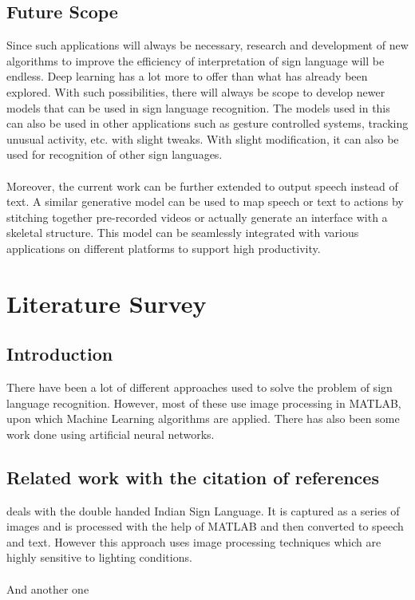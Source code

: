\documentclass[12pt,oneside,a4paper]{article}
\newcommand\todo[1]{\textcolor{blue}{#1}}
\newcommand\placeholder[1]{\todo{\lipsum[#1]}}
\begin{document}
		\subsection{Future Scope}
			Since such applications will always be necessary, research and development of new algorithms to improve the efficiency of interpretation of sign language will be endless. Deep learning has a lot more to offer than what has already been explored. With such possibilities, there will always be scope to develop newer models that can be used in sign language recognition. The models used in this can also be used in other applications such as gesture controlled systems, tracking unusual activity, etc. with slight tweaks. With slight modification, it can also be used for recognition of other sign languages. \\
			\\
			Moreover, the current work can be further extended to output speech instead of text. A similar generative model can be used to map speech or text to actions by stitching together pre-recorded videos or actually generate an interface with a skeletal structure. This model can be seamlessly integrated with various applications on different platforms to support high productivity.


	\section{Literature Survey}

		\subsection{Introduction}
			There have been a lot of different approaches used to solve the problem of sign language recognition. However, most of these use image processing in MATLAB, upon which Machine Learning algorithms are applied. There has also been some work done using artificial neural networks.

		\subsection{Related work with the citation of references}
			\cite{dutta:2015} deals with the double handed Indian Sign Language. It is captured as a series of images and is processed with the help of MATLAB and then converted to speech and text. However this approach uses image processing techniques which are highly sensitive to lighting conditions. \\
			\\
			\cite{DK:2014}
			\placeholder{2}
			And another one \\
			\cite{autoisl:2013} \placeholder{4}
\end{document}
